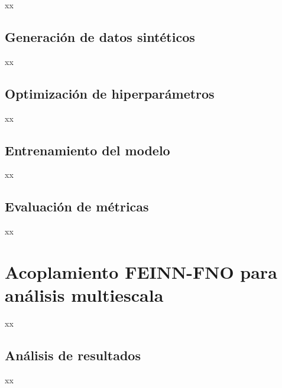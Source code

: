 xx

\subsection{Generación de datos sintéticos}

xx

\subsection{Optimización de hiperparámetros}

xx

\subsection{Entrenamiento del modelo}

xx

\subsection{Evaluación de métricas}

xx

\section{Acoplamiento FEINN-FNO para análisis multiescala}

xx

\subsection{Análisis de resultados}

xx
